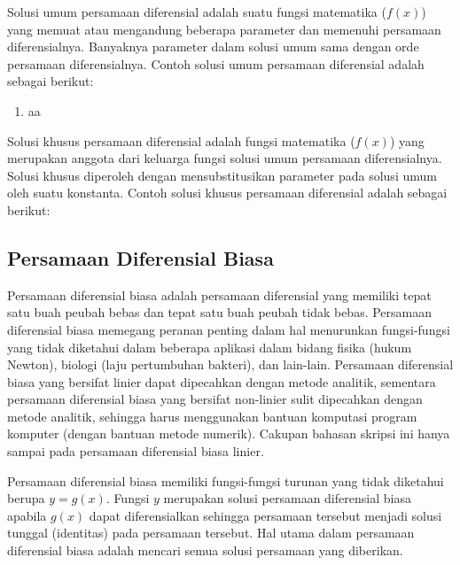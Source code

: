 Solusi umum persamaan diferensial adalah suatu fungsi matematika (\begin{math} f(x) \end{math}) yang memuat atau mengandung beberapa parameter dan memenuhi persamaan diferensialnya. Banyaknya parameter dalam solusi umum sama dengan orde persamaan diferensialnya. Contoh solusi umum persamaan diferensial adalah sebagai berikut:

\begin{enumerate}[1.]

	\item aa

\end{enumerate}

Solusi khusus persamaan diferensial adalah fungsi matematika (\begin{math} f(x) \end{math}) yang merupakan anggota dari keluarga fungsi solusi umum persamaan diferensialnya. Solusi khusus diperoleh dengan mensubstitusikan parameter pada solusi umum oleh suatu konstanta. Contoh solusi khusus persamaan diferensial adalah sebagai berikut:

\subsection{Persamaan Diferensial Biasa}
\label{sec:PDB}

Persamaan diferensial biasa adalah persamaan diferensial yang memiliki tepat satu buah peubah bebas dan tepat satu buah peubah tidak bebas. Persamaan diferensial biasa memegang peranan penting dalam hal menurunkan fungsi-fungsi yang tidak diketahui dalam beberapa
aplikasi dalam bidang fisika (hukum Newton), biologi (laju pertumbuhan bakteri), dan lain-lain. Persamaan diferensial biasa yang bersifat linier dapat dipecahkan dengan metode analitik, sementara persamaan diferensial biasa yang bersifat non-linier sulit dipecahkan dengan 
metode analitik, sehingga harus menggunakan bantuan komputasi program komputer (dengan bantuan metode numerik). Cakupan bahasan skripsi ini hanya sampai pada persamaan diferensial biasa linier. 

Persamaan diferensial biasa memiliki fungsi-fungsi turunan yang tidak diketahui berupa \begin{math} y = g(x) \end{math}. Fungsi \begin{math} y \end{math} merupakan solusi persamaan diferensial biasa apabila \begin{math} g(x) \end{math} dapat diferensialkan sehingga persamaan tersebut menjadi solusi tunggal (identitas) pada persamaan tersebut. Hal utama dalam persamaan diferensial biasa adalah mencari semua solusi persamaan yang diberikan. 

